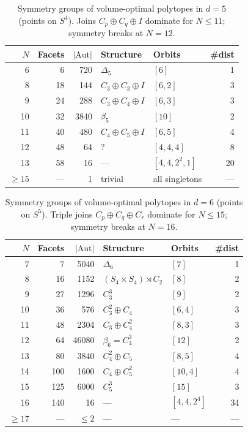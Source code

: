 \documentclass[11pt]{article}
\begin{document}
\begin{table}[ht]
\centering
\caption{Symmetry groups of volume-optimal polytopes in $d = 5$
(points on $S^4$).  Joins $C_p \oplus C_q \oplus I$ dominate
for $N \leq 11$; symmetry breaks at $N = 12$.}
\label{tab:symmetry_d5}
\smallskip
\begin{tabular}{r r r l l r}
\toprule
$N$ & Facets & $|\mathrm{Aut}|$ & Structure & Orbits & \#dist \\
\midrule
6  & 6    & 720    & $\Delta_5$             & $[6]$    & 1 \\
8  & 18   & 144    & $C_3 \oplus C_3 \oplus I$ & $[6,2]$  & 3 \\
9  & 24   & 288    & $C_3 \oplus C_4 \oplus I$ & $[6,3]$  & 3 \\
10 & 32   & 3840   & $\beta_5$              & $[10]$   & 2 \\
11 & 40   & 480    & $C_4 \oplus C_5 \oplus I$ & $[6,5]$  & 4 \\
\midrule
12 & 48   & 64     & ?                      & $[4,4,4]$& 8 \\
13 & 58   & 16     & ---                    & $[4,4,2^2,1]$ & 20 \\
$\geq 15$ & --- & 1 & trivial & all singletons & --- \\
\bottomrule
\end{tabular}
\end{table}

\begin{table}[ht]
\centering
\caption{Symmetry groups of volume-optimal polytopes in $d = 6$
(points on $S^5$).  Triple joins $C_p \oplus C_q \oplus C_r$
dominate for $N \leq 15$; symmetry breaks at $N = 16$.}
\label{tab:symmetry_d6}
\smallskip
\begin{tabular}{r r r l l r}
\toprule
$N$ & Facets & $|\mathrm{Aut}|$ & Structure & Orbits & \#dist \\
\midrule
7  & 7     & 5040   & $\Delta_6$             & $[7]$    & 1 \\
8  & 16    & 1152   & $(S_4 \times S_4) \rtimes C_2$ & $[8]$ & 2 \\
9  & 27    & 1296   & $C_3^3$                & $[9]$    & 2 \\
10 & 36    & 576    & $C_3^2 \oplus C_4$     & $[6,4]$  & 3 \\
11 & 48    & 2304   & $C_3 \oplus C_4^2$     & $[8,3]$  & 3 \\
12 & 64    & 46080  & $\beta_6 = C_4^3$      & $[12]$   & 2 \\
13 & 80    & 3840   & $C_4^2 \oplus C_5$     & $[8,5]$  & 4 \\
14 & 100   & 1600   & $C_4 \oplus C_5^2$     & $[10,4]$ & 4 \\
15 & 125   & 6000   & $C_5^3$                & $[15]$   & 3 \\
\midrule
16 & 140   & 16     & ---                    & $[4,4,2^4]$ & 34 \\
$\geq 17$ & --- & $\leq 2$ & --- & --- & --- \\
\bottomrule
\end{tabular}
\end{table}
\end{document}
